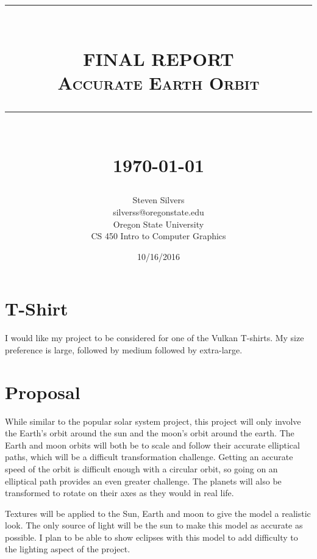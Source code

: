 \documentclass[12pt,serif,draftclsnofoot,onecolumn]{IEEEtran}
\newcommand{\HRule}[1]{\rule{\linewidth}{#1}}
\begin{document}
	\begin{titlepage}


	\title{ \normalsize \textsc{}
			\\ [2.0cm]
			\HRule{0.5pt} \\
			\LARGE \textbf{\uppercase{Final Report}}
			\\ \normalsize \textsc{Accurate Earth Orbit}
			\HRule{2pt} \\ [0.5cm]
			\normalsize \today \vspace*{5\baselineskip}}
	\date{10/16/2016}
	
	\author{Steven Silvers \\
			silverss@oregonstate.edu \\
			Oregon State University \\
			CS 450 Intro to Computer Graphics}
	\maketitle
	\end{titlepage}
	\tableofcontents
	\newpage
	\section{T-Shirt}
	\par
			I would like my project to be considered for one of the Vulkan T-shirts. My size preference is large, followed by medium followed by extra-large.
	\newline
	\section{Proposal}
	\par
			While similar to the popular solar system project, this project will only involve the Earth's orbit around the sun and the moon's orbit around the earth. The Earth and moon orbits will both be to scale and follow their accurate elliptical paths, which will be a difficult transformation challenge. Getting an accurate speed of the orbit is difficult enough with a circular orbit, so going on an elliptical path provides an even greater challenge. The planets will also be transformed to rotate on their axes as they would in real life.
	\newline
	\par
			Textures will be applied to the Sun, Earth and moon to give the model a realistic look. The only source of light will be the sun to make this model as accurate as possible. I plan to be able to show eclipses with this model to add difficulty to the lighting aspect of the project.
	\newline
\end{document}
